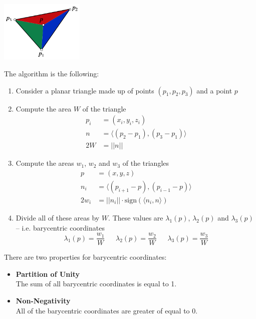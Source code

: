\documentclass{article}
\begin{document}
\begin{center}
	\includegraphics[width=4cm]{barycentric_coords.png}
\end{center}
The algorithm is the following:

\begin{enumerate}
	\item Consider a planar triangle made up of points $(p_1, p_2, p_3)$ and a point $p$
	\item Compute the area $W$ of the triangle
	\begin{align*}
		p_i &= (x_i, y_i, z_i) \\
		n &= \langle (p_2 - p_1), (p_3 - p_1) \rangle \\
		2W &= ||n||
	\end{align*}		
	\item Compute the areas $w_1$, $w_2$ and $w_3$ of the triangles
	\begin{align*}
		p &= (x, y, z) \\
		n_i &= \langle (p_{i+1} - p), (p_{i-1} - p) \rangle \\
		2w_i &= ||n_i|| \cdot \text{sign}(\langle n_i, n \rangle)
	\end{align*}
	\item Divide all of these areas by $W$. These values are $\lambda_1(p)$, $\lambda_2(p)$ and $\lambda_3(p)$ -- i.e. barycentric coordinates
	\[ \lambda_1(p) = \frac{w_1}{W} ~~~~~~~ \lambda_2(p) = \frac{w_2}{W} ~~~~~~~ \lambda_3(p) = \frac{w_3}{W} \]
\end{enumerate}
There are two properties for barycentric coordinates:

\begin{itemize}
	\item \textbf{Partition of Unity}
	\vspace{.2cm} \\
	The sum of all barycentric coordinates is equal to 1.
	
	\item \textbf{Non-Negativity}
	\vspace{.2cm} \\
	All of the barycentric coordinates are greater of equal to 0.
\end{itemize}
\end{document}
